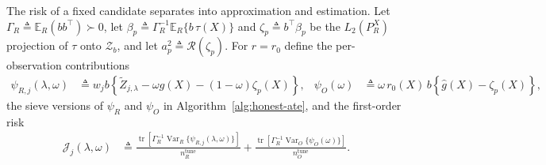 The risk of a fixed candidate separates into approximation and estimation. Let $\Gamma_R\triangleq\mathbb E_R(bb^\top)\succ0$, let $\beta_p\triangleq\Gamma_R^{-1}\mathbb E_R\{b\,\tau(X)\}$ and $\zeta_p\triangleq b^\top\beta_p$ be the $L_2(P_R^X)$ projection of $\tau$ onto $\mathcal Z_b$, and let $a_p^2\triangleq\mathcal R(\zeta_p)$. For $r=r_0$ define the per-observation contributions
\begin{align}
\psi_{R,j}(\lambda,\omega)
&\triangleq w_jb\left\{\widetilde Z_{j,\lambda}-\omega\widehat g(X)-(1-\omega)\zeta_p(X)\right\},
&
\psi_O(\omega)
&\triangleq\omega\,r_0(X)\,b\left\{\widehat g(X)-\zeta_p(X)\right\},
\label{eq:sieve-contributions}
\end{align}
the sieve versions of $\psi_R$ and $\psi_O$ in Algorithm~\ref{alg:honest-ate}, and the first-order risk
\begin{align}
\mathcal J_j(\lambda,\omega)
&\triangleq\frac{\operatorname{tr}[\Gamma_R^{-1}\operatorname{Var}_R\{\psi_{R,j}(\lambda,\omega)\}]}{n_R^{\mathrm{tune}}}
+\frac{\operatorname{tr}[\Gamma_R^{-1}\operatorname{Var}_O\{\psi_O(\omega)\}]}{n_O^{\mathrm{tune}}}.
\label{eq:sieve-first-order-risk}
\end{align}

